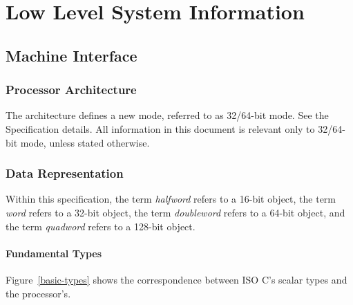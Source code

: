 \chapter{Low Level System Information}

\section{Machine Interface}

\subsection{Processor Architecture}

The \xARCH architecture defines a new mode, referred to as 32/64-bit
mode. See the \xARCH Specification details. All information in this
document is relevant only to 32/64-bit mode, unless stated otherwise.

\subsection{Data Representation}

Within this specification, the term \emph{halfword} refers to a 16-bit
object, the term \emph{word} refers to a 32-bit object, the term
\emph{doubleword} refers to a 64-bit object, and the term
\emph{quadword} refers to a 128-bit object.

\subsubsection{Fundamental Types}

Figure~\ref{basic-types} shows the correspondence between ISO C's
scalar types and the processor's.

